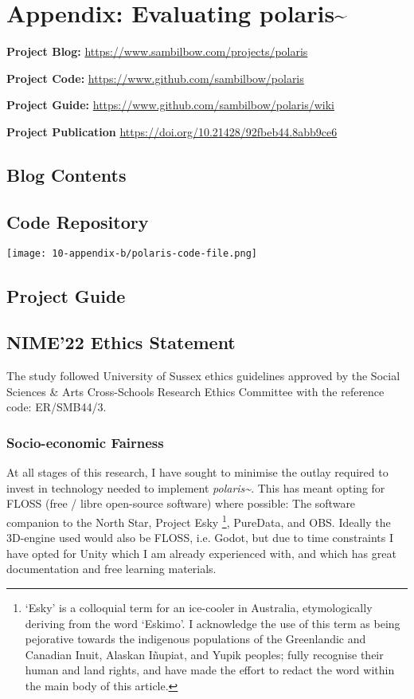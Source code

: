 \chapter{Appendix: Evaluating polaris\textasciitilde{}}

\noindent \textbf{Project Blog:}        \url{https://www.sambilbow.com/projects/polaris}

\noindent \textbf{Project Code:}        \url{https://www.github.com/sambilbow/polaris}

\noindent \textbf{Project Guide:}       \url{https://www.github.com/sambilbow/polaris/wiki}

\noindent \textbf{Project Publication } \url{https://doi.org/10.21428/92fbeb44.8abb9ce6}

\section{Blog Contents}
\section{Code Repository}
\texttt{[image: 10-appendix-b/polaris-code-file.png]}
\section{Project Guide}
\section{NIME'22 Ethics Statement}\label{sec: polaris-ethics}
The study followed University of Sussex ethics guidelines approved by the Social Sciences \& Arts Cross-Schools Research Ethics Committee with the reference code: ER/SMB44/3.

\subsection{Socio-economic Fairness}\label{sec: polaris-ethics-}
At all stages of this research, I have sought to minimise the outlay required to invest in technology needed to implement \textit{polaris\textasciitilde{}}. This has meant opting for FLOSS (free / libre open-source software) where possible: The software companion to the North Star, Project Esky \footnote{`Esky' is a colloquial term for an ice-cooler in Australia, etymologically deriving from the word ‘Eskimo’. I acknowledge the use of this term as being pejorative towards the indigenous populations of the Greenlandic and Canadian Inuit, Alaskan Iñupiat, and Yupik peoples; fully recognise their human and land rights, and have made the effort to redact the word within the main body of this article.}, PureData, and OBS. Ideally the 3D-engine used would also be FLOSS, i.e. Godot, but due to time constraints I have opted for Unity which I am already experienced with, and which has great documentation and free learning materials.

